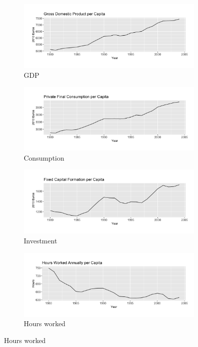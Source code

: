 \documentclass[12pt]{article}
\begin{document}
\begin{figure}
    \centering
  
    \begin{subfigure}[b]{0.45\textwidth}
      \includegraphics[width=\textwidth]{OUTPUT/MEDIA/gdp_pc.png}
      \caption{GDP}
    \end{subfigure}
    \hfill
    \begin{subfigure}[b]{0.45\textwidth}
      \includegraphics[width=\textwidth]{OUTPUT/MEDIA/cons_pc.png}
      \caption{Consumption}
    \end{subfigure}
  
    \vspace{\baselineskip} %
  
    \begin{subfigure}[b]{0.45\textwidth}
      \includegraphics[width=\textwidth]{OUTPUT/MEDIA/inv_pc.png}
      \caption{Investment}
    \end{subfigure}
    \hfill
    \begin{subfigure}[b]{0.45\textwidth}
      \includegraphics[width=\textwidth]{OUTPUT/MEDIA/hours_pc.png}
      \caption{Hours worked}
    \end{subfigure}
  

\end{figure}
\end{document}

